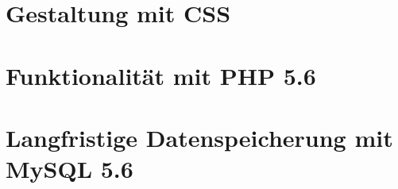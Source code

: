 \documentclass[11pt, a4paper, oneside, draft]{book}
\begin{document}
\chapter{Gestaltung mit CSS}
%
\chapter{Funktionalität mit PHP 5.6}
%
\chapter{Langfristige Datenspeicherung mit MySQL 5.6}


%

%


%

%

%

\renewcommand{\indexname}{Stichwortverzeichnis}		%
\printindex
\end{document}
